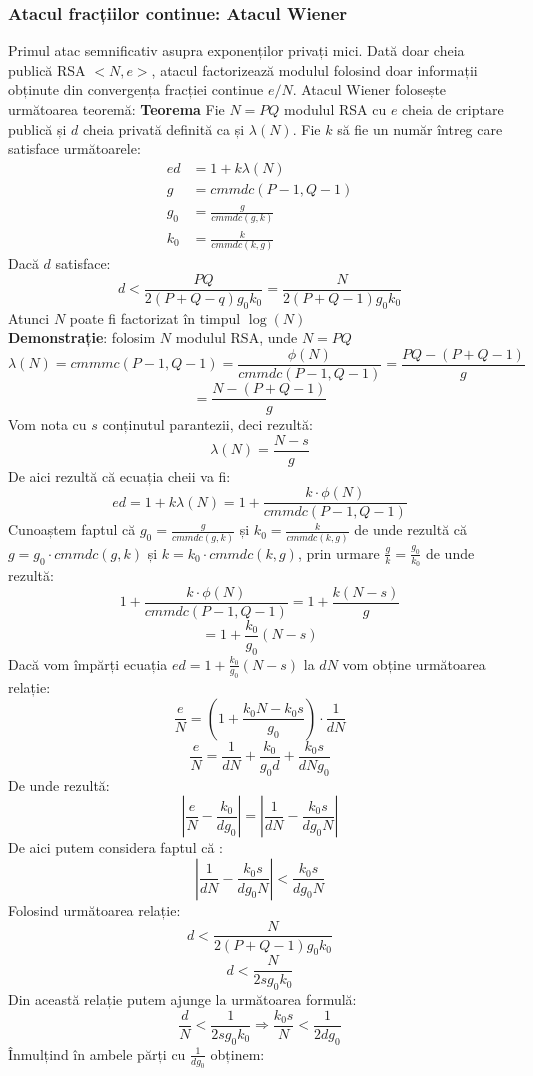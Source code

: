 \documentclass[12pt, oneside]{book}
\begin{document}
\subsubsection{Atacul fracțiilor continue: Atacul Wiener}
Primul atac semnificativ asupra exponenților privați mici. Dată doar cheia publică RSA $<N,e>$, atacul factorizează modulul folosind doar informații obținute din convergența fracției continue $e/N$. Atacul Wiener folosește următoarea teoremă:
\textbf{Teorema} Fie $N=PQ$ modulul RSA cu $e$ cheia de criptare publică și $d$ cheia privată definită ca și $\lambda(N)$. Fie $k$ să fie un număr întreg care satisface următoarele:
\begin{align*}
ed&=1+k \lambda(N) \\
g&=cmmdc(P-1,Q-1) \\
g_0&=\frac{g}{cmmdc(g,k)} \\
k_0&=\frac{k}{cmmdc(k,g)}
\end{align*}
Dacă $d$ satisface:
$$ d< \frac{PQ}{2(P+Q-q)g_0k_0} = \frac{N}{2(P+Q-1)g_0k_0}$$
Atunci $N$ poate fi factorizat în timpul $\log(N)$ \\
\textbf{Demonstrație}: folosim $N$ modulul RSA, unde $N=PQ$
$$ \lambda(N)=cmmmc(P-1,Q-1)=\frac{\phi(N)}{cmmdc(P-1,Q-1)}=\frac{PQ - (P+Q-1)}{g}$$
$$ = \frac{N - (P+Q-1)}{g}$$
Vom nota cu $s$ conținutul parantezii, deci rezultă:
$$ \lambda(N) = \frac{N-s}{g}$$
De aici rezultă că ecuația cheii va fi:
$$ed = 1 +k \lambda(N)= 1+ \frac{k \cdot  \phi(N)}{cmmdc(P-1,Q-1)} $$
Cunoaștem faptul că  $g_0 = \frac{g}{cmmdc(g,k)}$ și $k_0=\frac{k}{cmmdc(k,g)}$ de unde rezultă că $g=g_0 \cdot   cmmdc(g,k)$ și $k=k_0 \cdot   cmmdc(k,g)$, prin urmare $\frac{g}{k} = \frac{g_0}{k_0}$ de unde rezultă:
$$ 1+ \frac{k \cdot  \phi(N)}{cmmdc(P-1,Q-1)} = 1+ \frac{k (N-s)}{g} $$
$$ = 1+ \frac{k_0}{g_0} (N-s)$$
Dacă vom împărți ecuația $ed= 1+ \frac{k_0}{g_0} (N-s)$ la $dN$ vom obține următoarea relație:
$$ \frac{e}{N} = \left(  1+ \frac{k_0N - k_0s}{g_0}   \right) \cdot   \frac{1}{dN} $$
$$ \frac{e}{N} = \frac{1}{dN} + \frac{k_0}{g_0 d} +\frac{k_0s}{dNg_0}$$
De unde rezultă:
$$ \left |  \frac{e}{N} - \frac{k_0}{dg_0} \right| = \left| \frac{1}{dN} - \frac{k_0s}{dg_0N} \right| $$
De aici putem considera faptul că :
$$ \left| \frac{1}{dN} - \frac{k_0s}{dg_0N} \right| < \frac{k_0s}{dg_0N}$$
Folosind următoarea relație:
$$ d< \frac{N}{2(P+Q-1)g_0k_0}  $$
$$ d < \frac{N}{2sg_0k_0}$$
Din această relație putem ajunge la următoarea formulă:
$$ \frac{d}{N} < \frac{1}{2sg_0k_0} \Rightarrow \frac{k_0s}{N} < \frac{1}{2dg_0}$$
Înmulțind în ambele părți cu $\frac{1}{dg_0}$ obținem:
\end{document}
